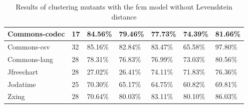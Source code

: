 \documentclass[../../main]{subfiles}
\begin{document}
\begin{table}[!htb]
\begin{tabular}{|l|l|l|l|l|l|l|}
Commons-codec         & 17                   & 84.56\%                           & 79.46\%                                                & 77.73\%                            & 74.39\%                                                                                                                                    & 81.66\%                                                                                                                                    \\ \hline
Commons-csv           & 32                   & 85.16\%                           & 82.84\%                                                & 83.47\%                            & 65.58\%                                                                                                                                    & 97.80\%                                                                                                                                    \\ \hline
Commons-lang          & 28                   & 78.31\%                           & 76.83\%                                                & 76.99\%                            & 73.03\%                                                                                                                                    & 80.56\%                                                                                                                                    \\ \hline
Jfreechart            & 28                   & 27.02\%                           & 26.41\%                                                & 74.11\%                            & 71.83\%                                                                                                                                    & 76.36\%                                                                                                                                    \\ \hline
Jodatime              & 25                   & 70.30\%                           & 65.17\%                                                & 64.75\%                            & 60.82\%                                                                                                                                    & 69.81\%                                                                                                                                    \\ \hline
Zxing                 & 28                   & 70.64\%                           & 80.03\%                                                & 83.11\%                            & 80.10\%                                                                                                                                    & 86.03\%                                                                                                                                    \\ \hline
\end{tabular}
\caption{\label{tab:ml_no_distance}Results of clustering mutants with the \acrshort{fcm} model without Levenshtein distance}
\end{table}
\FloatBarrier
\end{document}
